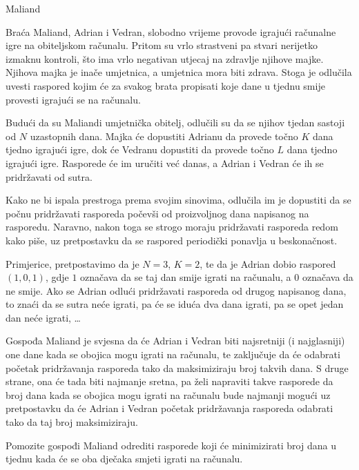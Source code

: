 \begin{statement}[
  problempoints=100,
  timelimit=2 sekunde,
  memorylimit=512 MiB,
]{Maliand}

Braća Maliand, Adrian i Vedran, slobodno vrijeme provode igrajući računalne
igre na obiteljskom računalu. Pritom su vrlo strastveni pa stvari nerijetko
izmaknu kontroli, što ima vrlo negativan utjecaj na zdravlje njihove majke.
Njihova majka je inače umjetnica, a umjetnica mora biti zdrava. Stoga je
odlučila uvesti raspored kojim će za svakog brata propisati koje dane u tjednu
smije provesti igrajući se na računalu.

Budući da su Maliandi umjetnička obitelj, odlučili su da se njihov tjedan
sastoji od $N$ uzastopnih dana.  Majka će dopustiti Adrianu da provede točno
$K$ dana tjedno igrajući igre, dok će Vedranu dopustiti da provede točno $L$
dana tjedno igrajući igre.  Rasporede će im uručiti već danas, a Adrian i
Vedran će ih se pridržavati od sutra.

Kako ne bi ispala prestroga prema svojim sinovima, odlučila im je dopustiti
da se počnu pridržavati rasporeda počevši od proizvoljnog dana napisanog na
rasporedu. Naravno, nakon toga se strogo moraju pridržavati rasporeda redom
kako piše, uz pretpostavku da se raspored periodički ponavlja u beskonačnost.

Primjerice, pretpostavimo da je $N=3$, $K=2$, te da je Adrian dobio raspored
$(1,0,1)$, gdje $1$ označava da se taj dan smije igrati na računalu, a $0$
označava da ne smije. Ako se Adrian odlući pridržavati rasporeda od drugog
napisanog dana, to znaći da se sutra neće igrati, pa će se iduća dva dana
igrati, pa se opet jedan dan neće igrati, \ldots

Gospođa Maliand je svjesna da će Adrian i Vedran biti najsretniji (i
najglasniji) one dane kada se obojica mogu igrati na računalu, te zaključuje
da će odabrati početak pridržavanja rasporeda tako da maksimiziraju broj
takvih dana.  S druge strane, ona će tada biti najmanje sretna, pa želi
napraviti takve rasporede da broj dana kada se obojica mogu igrati na
računalu bude najmanji mogući uz pretpostavku da će Adrian i Vedran početak
pridržavanja rasporeda odabrati tako da taj broj maksimiziraju.

Pomozite gospođi Maliand odrediti rasporede koji će minimizirati
broj dana u tjednu kada će se oba dječaka smjeti igrati na računalu.


\end{statement}
